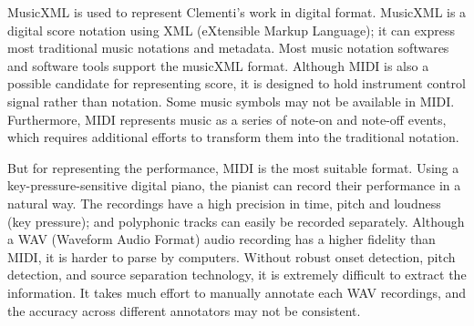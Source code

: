 MusicXML is used to represent Clementi's work in digital format.
MusicXML is a digital score notation using XML (eXtensible Markup Language); it can express most traditional music notations and metadata. Most music notation softwares and software tools support the musicXML format. %
%
Although MIDI is also a possible candidate for representing score, it is designed to hold instrument control signal rather than notation. Some music symbols may not be available in MIDI. Furthermore, MIDI represents music as a series of note-on and note-off events, which requires additional efforts to transform them into the traditional notation.

But for representing the performance, MIDI is the most suitable format. Using a key-pressure-sensitive digital piano, the pianist can record their performance in a natural way. The recordings have a high precision in time, pitch and loudness (key pressure); and polyphonic tracks can easily be recorded separately. Although a WAV (Waveform Audio Format) audio recording has a higher fidelity than MIDI, it is harder to parse by computers. Without robust onset detection, pitch detection, and source separation technology, it is extremely difficult to extract the information. It takes much effort to manually annotate each WAV recordings, and the accuracy across different annotators may not be consistent. 

